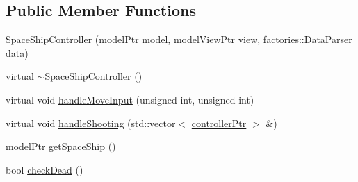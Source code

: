 \subsection*{\-Public \-Member \-Functions}
\begin{DoxyCompactItemize}
\item 
\hyperlink{classcontrollers_1_1SpaceShipController_a49b68fbf6f81da8c6e8be652d4c2b445}{\-Space\-Ship\-Controller} (\hyperlink{ModelView_8h_a78966ddb517fca8d2b29a2bc5c31e74e}{model\-Ptr} model, \hyperlink{Controller_8h_a8ca0a41a38eb52be242997413482c0cf}{model\-View\-Ptr} view, \hyperlink{classfactories_1_1DataParser}{factories\-::\-Data\-Parser} data)
\item 
virtual \hyperlink{classcontrollers_1_1SpaceShipController_a89460a298e0e7eccd5652f58d3e19f82}{$\sim$\-Space\-Ship\-Controller} ()
\item 
virtual void \hyperlink{classcontrollers_1_1SpaceShipController_a96d07a881e92ee0d2dfcdd14437b4825}{handle\-Move\-Input} (unsigned int, unsigned int)
\item 
virtual void \hyperlink{classcontrollers_1_1SpaceShipController_a26f392d067a63e8b5114ff3b37c0b089}{handle\-Shooting} (std\-::vector$<$ \hyperlink{namespacecontrollers_ab74cf2ed38c0b0460698b4eb6fe8bec5}{controller\-Ptr} $>$ \&)
\item 
\hyperlink{ModelView_8h_a78966ddb517fca8d2b29a2bc5c31e74e}{model\-Ptr} \hyperlink{classcontrollers_1_1SpaceShipController_a99f9abf2a79c217701fb71bf7eb2e9b5}{get\-Space\-Ship} ()
\item 
bool \hyperlink{classcontrollers_1_1SpaceShipController_aadf294b8917a69f591e34664f6704f18}{check\-Dead} ()
\end{DoxyCompactItemize}


